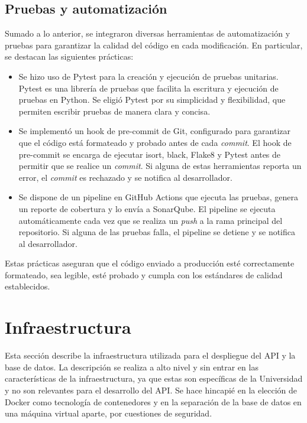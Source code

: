 \subsection{Pruebas y automatización}

Sumado a lo anterior, se integraron diversas herramientas de automatización y pruebas para garantizar la calidad del código en cada modificación. En particular, se destacan las siguientes prácticas:

\begin{itemize}
	\item Se hizo uso de \gls{Pytest} para la creación y ejecución de \gls{pruebas unitarias}. \gls{Pytest} es una librería de pruebas que facilita la escritura y ejecución de pruebas en \gls{Python}. Se eligió \gls{Pytest} por su simplicidad y flexibilidad, que permiten escribir pruebas de manera clara y concisa.
	\item Se implementó un \gls{hook} de pre-commit de \gls{Git}, configurado para garantizar que el código está formateado y probado antes de cada \textit{commit}. El \gls{hook} de pre-commit se encarga de ejecutar \gls{isort}, \gls{black}, \gls{Flake8} y \gls{Pytest} antes de permitir que se realice un \textit{commit}. Si alguna de estas herramientas reporta un error, el \textit{commit} es rechazado y se notifica al desarrollador.
	\item Se dispone de un \gls{pipeline} en \gls{GitHub Actions} que ejecuta las pruebas, genera un reporte de cobertura y lo envía a \gls{SonarQube}. El \gls{pipeline} se ejecuta automáticamente cada vez que se realiza un \textit{push} a la rama principal del repositorio. Si alguna de las pruebas falla, el \gls{pipeline} se detiene y se notifica al desarrollador.
\end{itemize}

Estas prácticas aseguran que el código enviado a producción esté correctamente formateado, sea legible, esté probado y cumpla con los estándares de calidad establecidos.

\section{Infraestructura}

Esta sección describe la infraestructura utilizada para el despliegue del \gls{API} y la base de datos. La descripción se realiza a alto nivel y sin entrar en las características de la infraestructura, ya que estas son específicas de la Universidad y no son relevantes para el desarrollo del \gls{API}. Se hace hincapié en la elección de \gls{Docker} como tecnología de contenedores y en la separación de la base de datos en una máquina virtual aparte, por cuestiones de seguridad.

